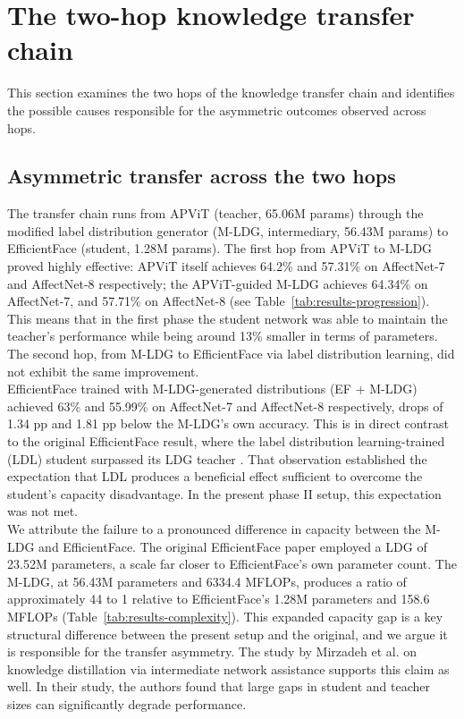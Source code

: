 \section{The two-hop knowledge transfer chain}
\label{section:discussion-transfer-chain}

This section examines the two hops of the knowledge transfer chain and identifies the possible causes responsible for the asymmetric outcomes observed across hops.\\

\subsection{Asymmetric transfer across the two hops}
\label{section:discussion-dp2}

The transfer chain runs from APViT (teacher, 65.06M params) through the modified label distribution generator (M-LDG, intermediary, 56.43M params) to EfficientFace (student, 1.28M params). The first hop from APViT to M-LDG proved highly effective: APViT itself achieves 64.2\% and 57.31\% on AffectNet-7 and AffectNet-8 respectively; the APViT-guided M-LDG achieves 64.34\% on AffectNet-7, and 57.71\% on AffectNet-8 (see Table~\ref{tab:results-progression}). This means that in the first phase the student network was able to maintain the teacher's performance while being around 13\% smaller in terms of parameters. The second hop, from M-LDG to EfficientFace via label distribution learning, did not exhibit the same improvement.\\

EfficientFace trained with M-LDG-generated distributions (EF + M-LDG) achieved 63\% and 55.99\% on AffectNet-7 and AffectNet-8 respectively, drops of 1.34 pp and 1.81 pp below the M-LDG's own accuracy. This is in direct contrast to the original EfficientFace result, where the label distribution learning-trained (LDL) student surpassed its LDG teacher \cite{eff-face2021}. That observation established the expectation that LDL produces a beneficial effect sufficient to overcome the student's capacity disadvantage. In the present phase II setup, this expectation was not met.\\

We attribute the failure to a pronounced difference in capacity between the M-LDG and EfficientFace. The original EfficientFace paper \cite{eff-face2021} employed a LDG of 23.52M parameters, a scale far closer to EfficientFace's own parameter count. The M-LDG, at 56.43M parameters and 6334.4 MFLOPs, produces a ratio of approximately 44 to 1 relative to EfficientFace's 1.28M parameters and 158.6 MFLOPs (Table~\ref{tab:results-complexity}). This expanded capacity gap is a key structural difference between the present setup and the original, and we argue it is responsible for the transfer asymmetry. The study by Mirzadeh et al. \cite{mirzadeh2020takd} on knowledge distillation via intermediate network assistance supports this claim as well. In their study, the authors found that large gaps in student and teacher sizes can significantly degrade performance.

